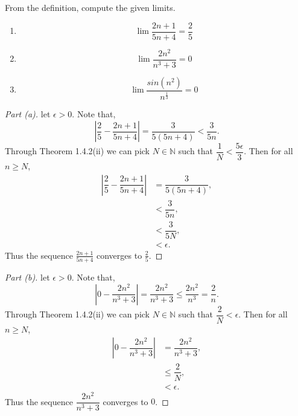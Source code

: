 \documentclass[12pt]{article}
\makeatletter
\theoremstyle{homework}
\newenvironment{exercise}[1]
{\def\@currentlabel{#1}\exercisecore}
{\endexercisecore}
\newcommand{\Nats}{\ensuremath{\mathbb N}}
\makeatother
\begin{document}
\begin{exercise}{2.2.2}
From the definition, compute the given limits.
\begin{enumerate}
	\item[\textbf{a.}] 
	\begin{equation*}
		\lim \dfrac{2n+1}{5n+4} = \dfrac{2}{5}
	\end{equation*} 
	\item[\textbf{b.}]
	\begin{equation*}
		\lim \dfrac{2n^2}{n^3+3} = 0 
	\end{equation*}
	\item[\textbf{c.}] 
	\begin{equation*}
		\lim \dfrac{sin(n^2)}{n^\frac{1}{3}} = 0 
	\end{equation*} 
\end{enumerate}
\end{exercise}
\begin{proof}[Part (a)] let $\epsilon > 0$. Note that,
	\begin{equation*}
		|\dfrac{2}{5} - \dfrac{2n+1}{5n+4}| = \dfrac{3}{5(5n+4)} < \dfrac{3}{5n}.
	\end{equation*}
	Through Theorem 1.4.2(ii) we can pick $N \in \Nats$ such that $\dfrac{1}{N}<\dfrac{5\epsilon}{3}$. Then for all $n \geq N$,
	\begin{align*}
		|\dfrac{2}{5} - \dfrac{2n+1}{5n+4}| &= \dfrac{3}{5(5n+4)},\\
		&<\dfrac{3}{5n},\\
		&<\dfrac{3}{5N},\\
		&< \epsilon.
	\end{align*}
	Thus the sequence $\frac{2n+1}{5n+4}$ converges to $\frac{2}{5}$.  
\end{proof}
\begin{proof}[Part (b)] let $\epsilon > 0$. Note that,
	\begin{equation*}
		|0 - \dfrac{2n^2}{n^3+3}| = \dfrac{2n^2}{n^3+3} \le \dfrac{2n^2}{n^3} = \dfrac{2}{n}.
	\end{equation*}
	Through Theorem 1.4.2(ii) we can pick $N \in \Nats$ such that $\dfrac{2}{N}<\epsilon$. Then for all $n \geq N$,
	\begin{align*}
		|0 - \dfrac{2n^2}{n^3+3}| &= \dfrac{2n^2}{n^3+3},\\
		&\le \dfrac{2}{N},\\
		&< \epsilon.
	\end{align*}
	Thus the sequence $\dfrac{2n^2}{n^3+3}$ converges to $0$.  
\end{proof} 
\end{document}
